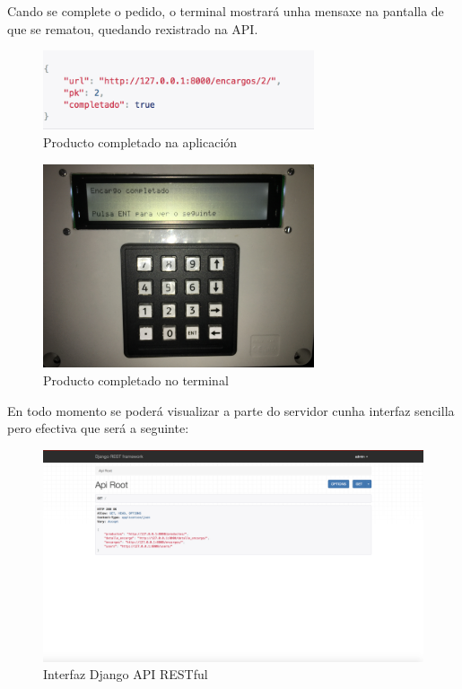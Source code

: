 \documentclass[11pt,twoside]{book}
\begin{document}
Cando se complete o pedido, o terminal mostrará unha mensaxe na pantalla de que se rematou, quedando rexistrado na API.
\begin{figure}[H]
	\begin{center}
		\includegraphics[width=8cm]{images/API_modificada.png}
	\end{center}
	\caption{Producto completado na aplicación}
	\label{fig:Encargo1}
\end{figure}
\begin{figure}[H]
	\begin{center}
		\includegraphics[width=8cm]{images/encargo_completado.JPG}
	\end{center}
	\caption{Producto completado no terminal}
	\label{fig:Encargo1}
\end{figure}

En todo momento se poderá visualizar a parte do servidor cunha interfaz sencilla pero efectiva que será a seguinte:

\begin{figure}[H]
	\begin{center}
		\includegraphics[width=12cm]{images/API_Root_Django.png}
	\end{center}
	\caption{Interfaz Django API RESTful}
	\label{fig:Encargo1}
\end{figure}
\end{document}
